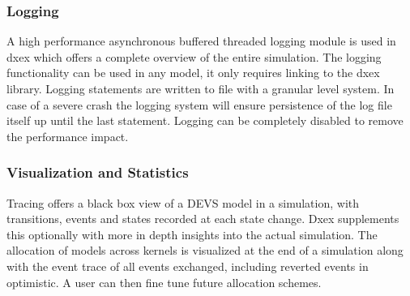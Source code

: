 \subsubsection{Logging}
A high performance asynchronous buffered threaded logging module is used in dxex which offers a complete overview of the entire simulation. The logging functionality can be used in any model, it only requires linking to the dxex library. Logging statements are written to file with a granular level system. In case of a severe crash the logging system will ensure persistence of the log file itself up until the last statement. Logging can be completely disabled to remove the performance impact.
\subsubsection{Visualization and Statistics}
Tracing offers a black box view of a DEVS model in a simulation, with transitions, events and states recorded at each state change. Dxex supplements this optionally with more in depth insights into the actual simulation. 
The allocation of models across kernels is visualized at the end of a simulation along with the event trace of all events exchanged, including reverted events in optimistic. 
A user can then fine tune future allocation schemes. 

